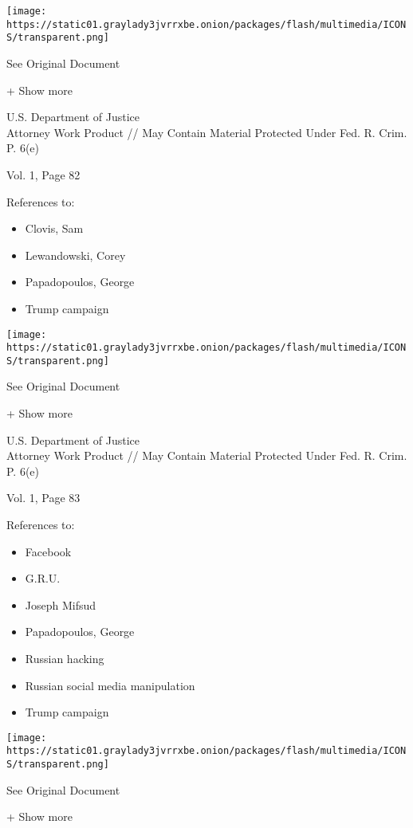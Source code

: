 \protect\hyperlink{}{}

\texttt{[image: https://static01.graylady3jvrrxbe.onion/packages/flash/multimedia/ICONS/transparent.png]}

See Original Document

+ Show more

U.S. Department of Justice\\
Attorney Work Product // May Contain Material Protected Under Fed. R.
Crim. P. 6(e)

Vol. 1, Page 82

References to:

\begin{itemize}
\tightlist
\item
  Clovis, Sam
\item
  Lewandowski, Corey
\item
  Papadopoulos, George
\item
  Trump campaign
\end{itemize}

\protect\hyperlink{}{}

\texttt{[image: https://static01.graylady3jvrrxbe.onion/packages/flash/multimedia/ICONS/transparent.png]}

See Original Document

+ Show more

U.S. Department of Justice\\
Attorney Work Product // May Contain Material Protected Under Fed. R.
Crim. P. 6(e)

Vol. 1, Page 83

References to:

\begin{itemize}
\tightlist
\item
  Facebook
\item
  G.R.U.
\item
  Joseph Mifsud
\item
  Papadopoulos, George
\item
  Russian hacking
\item
  Russian social media manipulation
\item
  Trump campaign
\end{itemize}

\protect\hyperlink{}{}

\texttt{[image: https://static01.graylady3jvrrxbe.onion/packages/flash/multimedia/ICONS/transparent.png]}

See Original Document

+ Show more

